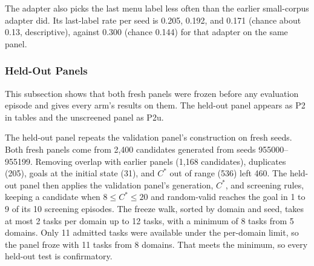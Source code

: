 The adapter also picks the last menu label less often than the earlier small-corpus adapter did. Its last-label rate per seed is 0.205, 0.192, and 0.171 (chance about 0.13, descriptive), against 0.300 (chance 0.144) for that adapter on the same panel.

\subsubsection{Held-Out Panels}
\label{app:results-panels}

This subsection shows that both fresh panels were frozen before any evaluation episode and gives every arm's results on them. The held-out panel appears as P2 in tables and the unscreened panel as P2u.

The held-out panel repeats the validation panel's construction on fresh seeds. Both fresh panels come from 2,400 candidates generated from seeds 955000--955199. Removing overlap with earlier panels (1,168 candidates), duplicates (205), goals at the initial state (31), and $C^*$ out of range (536) left 460. The held-out panel then applies the validation panel's generation, $C^*$, and screening rules, keeping a candidate when $8 \le C^* \le 20$ and random-valid reaches the goal in 1 to 9 of its 10 screening episodes. The freeze walk, sorted by domain and seed, takes at most 2 tasks per domain up to 12 tasks, with a minimum of 8 tasks from 5 domains. Only 11 admitted tasks were available under the per-domain limit, so the panel froze with 11 tasks from 8 domains. That meets the minimum, so every held-out test is confirmatory.

